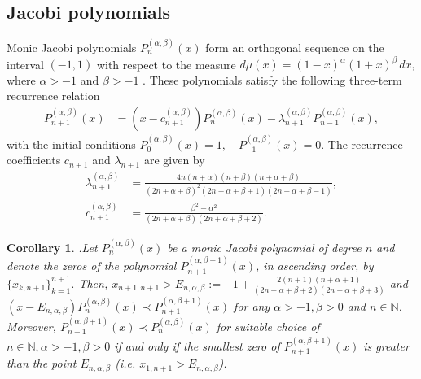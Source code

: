 \documentclass[final,3p,times,12pt]{elsarticle}
\newtheorem{corollary}{Corollary}[section]
\numberwithin{equation}{section}  %
\begin{document}
\subsection{Jacobi polynomials}\label{Examples Jacobi}
Monic Jacobi polynomials \( P_n^{(\alpha, \beta)}(x) \) form an orthogonal sequence on the interval \( (-1, 1) \) with respect to the measure $d\mu(x) = (1 - x)^\alpha (1 + x)^\beta \, dx,$ where \( \alpha > -1 \) and \( \beta > -1 \) \cite{Chiharabook}. These polynomials satisfy the following three-term recurrence relation 
\begin{align} \label{TTRR-Monic-Jacobi}
	P_{n+1}^{(\alpha, \beta)}(x) &= (x - c^{(\alpha, \beta)}_{n+1}) P_n^{(\alpha, \beta)}(x) - \lambda^{(\alpha, \beta)}_{n+1}  P_{n-1}^{(\alpha, \beta)}(x),
\end{align} with the initial conditions $	P_0^{(\alpha, \beta)}(x) = 1, \quad P_{-1}^{(\alpha, \beta)}(x) = 0.$ The recurrence coefficients \( c_{n+1} \) and \( \lambda_{n+1} \) are given by
\begin{align}\label{Recurrence-Coeffcients-Monic-Jacobi}
	\nonumber	\lambda^{(\alpha, \beta)}_{n+1} &= \frac{4n(n + \alpha)(n + \beta)(n + \alpha + \beta)}{(2n + \alpha + \beta)^2 (2n + \alpha + \beta + 1)(2n + \alpha + \beta - 1)},\\
	c^{(\alpha, \beta)}_{n+1} &= \frac{\beta^2 - \alpha^2}{(2n + \alpha + \beta)(2n + \alpha + \beta + 2)}. 
\end{align}
\begin{corollary}\cite[Theorem 1]{Arvesu-Driver-Littlejohn-RamanujanJ-2023}.\label{interlaceJacobi-n_ab-n+1_ab+1}
	Let $P^{(\alpha, \beta)}_n(x)$ be a monic Jacobi  polynomial of degree $n$ and denote the zeros of the polynomial $P^{(\alpha, \beta+1)}_{n+1}(x)$, in ascending order, by $\{x_{k,n+1}\}_{k=1}^{n+1}$. Then, $x_{n+1,n+1}>E_{n,\alpha,\beta}:= -1 + \frac{2(n+1)(n+\alpha+1)}{(2n+\alpha+\beta+2)(2n+\alpha+\beta+3)}$ and $(x-E_{n,\alpha,\beta})P^{(\alpha, \beta)}_n(x)\prec P^{(\alpha, \beta+1)}_{n+1}(x)$ for any $\alpha>-1, \beta >0$ and $n\in \mathbb{N}$. Moreover,   $P^{(\alpha,\beta+1)}_{n+1}(x)\prec P^{(\alpha, \beta)}_n(x)$ for suitable choice of $n\in \mathbb{N}, \alpha>-1, \beta>0$ if and only if the smallest zero of $P^{(\alpha,\beta+1)}_{n+1}(x)$ is greater than the point $E_{n,\alpha,\beta}$ (i.e. $x_{1,n+1}>E_{n,\alpha,\beta}$).
\end{corollary} 
\end{document}
